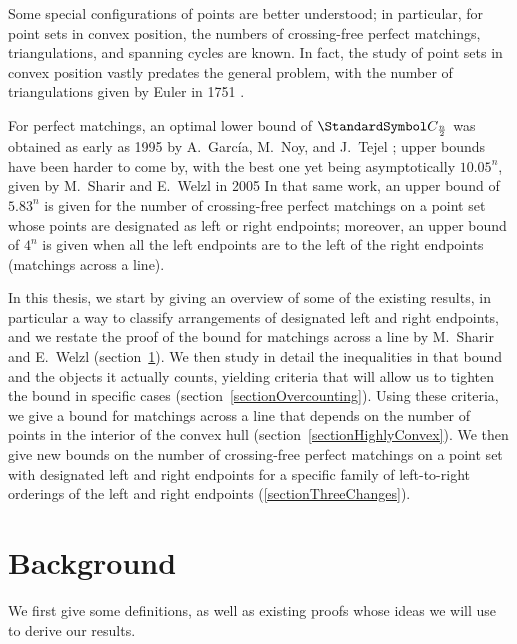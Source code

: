 \documentclass[10pt, a4paper, twoside]{basestyle}
\newcommand{\CatalanNumber}[1]{\StandardSymbol C_{#1}}
\begin{document}
Some special configurations of points are better understood; in particular, for point sets in convex position,
the numbers of crossing-free perfect matchings, triangulations, and spanning cycles are known. In fact, the study
of point sets in convex position vastly predates the general problem, with the number of triangulations given by
Euler in 1751 \cite{Euler1751}.

For perfect matchings, an optimal lower bound of $\CatalanNumber {\frac n 2}$ was obtained as early as 1995 by A.~García,
M.~Noy, and J.~Tejel \cite{GarciaNoyTejel2000}; upper bounds have been harder to come by, with the best one
yet being asymptotically $10.05^n$, given by M.~Sharir and E.~Welzl in 2005 \cite{SharirWelzl2006}
In that same work, an upper bound of $5.83^n$ is given for the number of crossing-free perfect matchings on a
point set whose points are designated as left or right endpoints; moreover, an upper bound of $4^n$ is given
when all the left endpoints are to the left of the right endpoints (matchings across a line).

In this thesis, 
we start by giving an overview of some of the existing results, in particular a way
to classify arrangements of designated left and right endpoints,
and we restate the proof of the bound for matchings across a line by M.~Sharir and E.~Welzl
(section~\ref{sectionBackground}).
We then study in detail the inequalities in that bound and the objects it actually counts,
yielding criteria that will allow us to tighten the bound in specific cases (section~\ref{sectionOvercounting}).
Using these criteria, we give a bound for
matchings across a line that depends on the number of points in the interior of the convex hull
(section~\ref{sectionHighlyConvex}).
We then give new bounds on the number of crossing-free perfect matchings on a point set with designated left and
right endpoints for a specific family of left-to-right orderings of the left and right endpoints
(\ref{sectionThreeChanges}). 
\section{Background}
\label{sectionBackground}
We first give some definitions, as well as existing proofs whose ideas we will use to derive our results.
\end{document}
